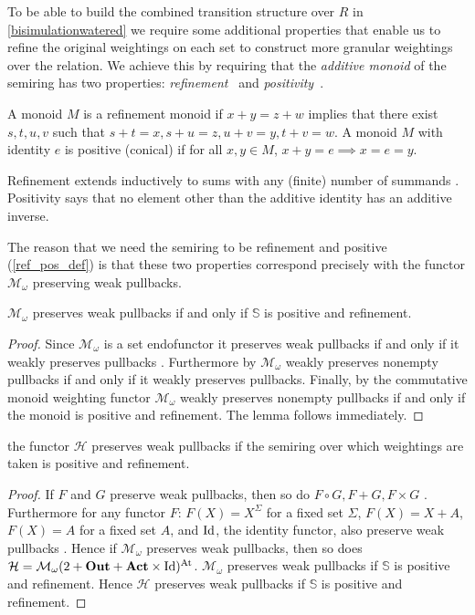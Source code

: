 \documentclass[a4paper,UKenglish,cleveref, autoref, thm-restate]{lipics-v2021}
\newcommand{\Out}{\textbf{\upshape{Out}}}
\newcommand{\Act}{\textbf{\upshape{Act}}}
\newcommand{\Id}{\text{\upshape{Id}}}
\newcommand{\At}{\text{\upshape{At}}}
\newcommand{\Mon}{\mathcal{M}_\omega}
\theoremstyle{plain}\newtheoremrep{thm}{Theorem}[section]
\begin{document}
	To be able to build the combined transition structure over $R$ in \cref{bisimulationwatered} we require some additional properties that enable us to refine the original weightings on each set to construct more granular weightings over the relation. We achieve this by requiring that the \textit{additive monoid} of the semiring has two properties: \emph{refinement}~\cite{refinementmonoids} and \emph{positivity}~\cite{gumm2009copower}.
	\begin{defn}\label{ref_pos_def}
		A monoid $M$ is a refinement monoid if $x+y=z+w$ implies that there exist  $s,t,u,v$ such that $s+t=x, s+u=z, u+v=y, t+v=w$. A monoid $M$ with identity $e$ is positive (conical) if for all $x,y\in M$, $x+y=e \implies x=e=y$.
	\end{defn} 
	 Refinement extends inductively to sums with any (finite) number of summands \cite{refinementmonoids}. Positivity says that no element other than the additive identity has an additive inverse. 
	 	\begin{toappendix}
		The reason that we need the semiring to be refinement and positive (\cref{ref_pos_def}) is that these two properties correspond precisely with the functor $\Mon$ preserving weak pullbacks.
		\begin{lem}
			$\Mon$ preserves weak pullbacks if and only if $\mathbb S$ is positive and refinement.
		\end{lem}
		\begin{proof}
			Since $\Mon$ is a set endofunctor it preserves weak pullbacks if and only if it weakly preserves pullbacks \cite[p.~20]{gumm2021freelatticefunctorsweaklypreserve}. Furthermore by \cite[Theorem 2.7]{typesandcoalg} $\Mon$ weakly preserves nonempty pullbacks if and only if it weakly preserves pullbacks. Finally, by \cite[Theorem 5.3]{GUMM2001185} the commutative monoid weighting functor $\Mon$ weakly preserves nonempty pullbacks if and only if the monoid is positive and refinement. The lemma follows immediately.
		\end{proof}
		\begin{lem}
			the functor $\mathcal{H}$ preserves weak pullbacks if the semiring over which weightings are taken is positive and refinement. \label{refinementIsPullbacks}
		\end{lem}
		\begin{proof}
			If $F$ and $G$ preserve weak pullbacks, then so do $F \circ G, F+G, F \times G$ \cite{PETERGUMM2000111}. Furthermore for any functor $F$: $F(X) = X^\Sigma$ for a fixed set $\Sigma$, $F(X) = X+A$, $F(X) = A$ for a fixed set $A$, and $\Id$, the identity functor, also preserve weak pullbacks \cite{PETERGUMM2000111}. Hence if $\Mon$ preserves weak pullbacks, then so does $\mathcal{H} = \Mon(2+\Out+\Act\times \Id)^{\At}$. $\Mon$ preserves weak pullbacks if $\mathbb{S}$ is positive and refinement. Hence $\mathcal H$ preserves weak pullbacks if $\mathbb{S}$ is positive and refinement.
		\end{proof}
	\end{toappendix}
\end{document}
